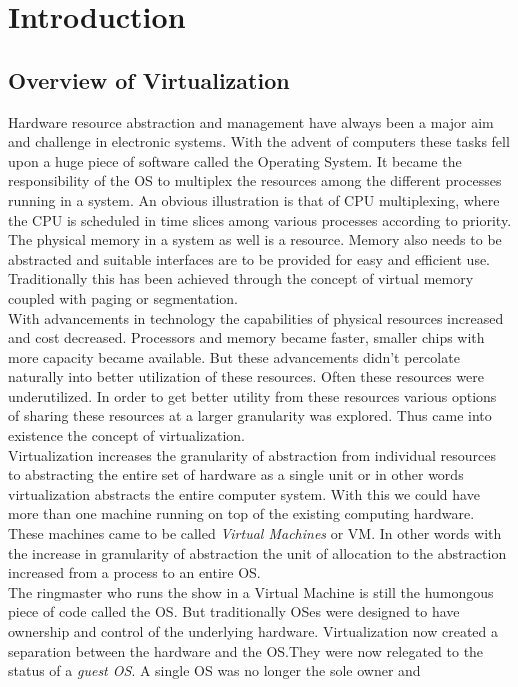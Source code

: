\chapter{Introduction} \label{introduction}
\section{Overview of Virtualization}
Hardware resource abstraction and management have always been a major aim and challenge in
electronic systems. With the advent of computers these tasks fell upon a huge piece of software
called the Operating System. It became the responsibility of the OS to multiplex the resources
among the different processes running in a system. An obvious illustration is that of CPU
multiplexing, where the CPU is scheduled in time slices among various processes according to
priority. The physical memory in a system as well is a resource. Memory also needs to be
abstracted and suitable interfaces are to be provided for easy and efficient use. Traditionally
this has been achieved through the concept of virtual memory coupled with paging or segmentation.
\\
With advancements in technology the capabilities of physical resources increased and cost
decreased. Processors and memory became faster, smaller chips with more capacity became available.
But these advancements didn't percolate naturally into better utilization of these resources.
Often these resources were underutilized. In order to get better utility from these resources
various options of sharing these resources at a larger granularity was explored. Thus came into
existence the concept of virtualization.\\
Virtualization increases the granularity of abstraction from individual resources to abstracting
the entire set of hardware as a single unit or in other words virtualization abstracts the entire
computer system. With this we could have more than one machine running on top of the existing
computing hardware. These machines came to be called \textit{Virtual Machines} or VM. In other
words with the increase in granularity of abstraction the unit of allocation to the abstraction
increased from a process to an entire OS.\\
The ringmaster who runs the show in a Virtual Machine is still the humongous piece of code called
the OS. But traditionally OSes were designed to have ownership and control of the underlying
hardware. Virtualization now created a separation between the hardware and the OS.They were now
relegated to the status of a \textit{guest OS}. A single OS was no longer the sole owner and
